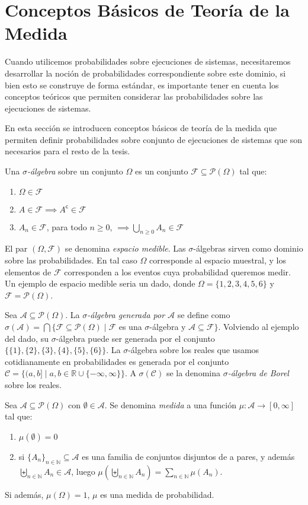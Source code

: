 \section{Conceptos Básicos de Teoría de la Medida}
Cuando utilicemos probabilidades sobre  ejecuciones de sistemas, necesitaremos desarrollar la noción de probabilidades correspondiente sobre este dominio, si bien esto se construye de forma estándar, es importante tener en cuenta los conceptos teóricos que permiten considerar las probabilidades sobre las ejecuciones de sistemas.

En esta sección se introducen conceptos básicos de teoría de la medida que permiten definir probabilidades sobre conjunto de ejecuciones de sistemas que son necesarios para el resto de la tesis.

Una \emph{$\sigma$-álgebra} sobre un conjunto $\Omega$ es un conjunto $\mathcal{F} \subseteq \mathcal{P}(\Omega)$ tal que:
\begin{enumerate}
\item $\Omega \in \mathcal{F}$
\item $A \in \mathcal{F} \implies A^\mathsf{c} \in \mathcal{F}$
\item $A_n \in \mathcal{F}$, para todo $n \geq 0$, $ \implies \bigcup_{n \geq 0}A_n \in \mathcal{F}$
\end{enumerate}
El par $(\Omega,\mathcal{F})$ se denomina \emph{espacio medible}.
Las $\sigma$-álgebras sirven como dominio sobre las probabilidades. En tal caso $\Omega$ corresponde al espacio muestral, y los elementos de $\mathcal{F}$ corresponden a los eventos cuya probabilidad queremos medir. Un ejemplo de espacio medible seria un dado, donde $\Omega=\{1,2,3,4,5,6\}$ y $\mathcal{F}=\mathcal{P}(\Omega)$.

Sea $\mathcal{A} \subseteq \mathcal{P}(\Omega)$. La \emph{$\sigma$-álgebra generada por $\mathcal{A}$} se define como $\sigma(\mathcal{A}) = \bigcap\{\mathcal{F} \subseteq \mathcal{P}(\Omega) \mid \mathcal{F}$ es una $\sigma$-álgebra y $\mathcal{A} \subseteq \mathcal{F}\}$. Volviendo al ejemplo del dado, su $\sigma$-álgebra puede ser generada por el conjunto $\{\{1\},\{2\},\{3\},\{4\},\{5\},\{6\}\}$. La $\sigma$-álgebra sobre los reales que usamos cotidianamente en probabilidades es generada por el conjunto $\mathcal{C} = \{(a,b] \mid a,b \in \mathbb{R} \cup \{-\infty,\infty\}\}$. A $\sigma(\mathcal{C})$ se la denomina \textit{$\sigma$-álgebra de Borel} sobre los reales.

Sea $\mathcal{A} \subseteq \mathcal{P}(\Omega)$ con $\emptyset \in \mathcal{A}$. Se denomina \emph{medida} a una función $\mu:\mathcal{A} \rightarrow [0,\infty]$ tal que:
\begin{enumerate}
\item $\mu(\emptyset) = 0$
\item si $\{A_n\}_{n \in \mathbb{N}} \subseteq \mathcal{A}$ es una familia de conjuntos disjuntos de a pares, y además $\biguplus_{n \in \mathbb{N}} A_n \in \mathcal{A}$, luego $\mu(\biguplus_{n \in \mathbb{N}} A_n) = \sum_{n \in \mathbb{N}} \mu(A_n)$.
\end{enumerate}
Si además, $\mu(\Omega) = 1$, $\mu$ es una medida de probabilidad.


